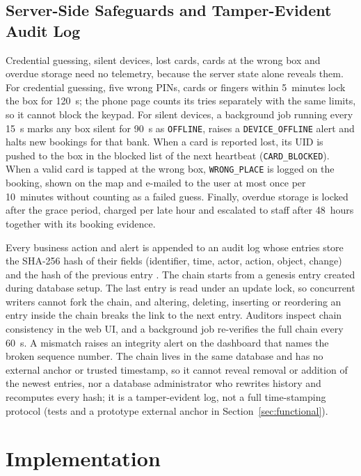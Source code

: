 \documentclass[journal,onecolumn]{IEEEtran}
\begin{document}
\subsection{Server-Side Safeguards and Tamper-Evident Audit Log}

Credential guessing, silent devices, lost cards, cards at the wrong box and overdue storage need no telemetry, because
the server state alone reveals them. For credential guessing, five wrong PINs, cards or fingers within 5~minutes lock
the box for 120~s; the phone page counts its tries separately with the same limits, so it cannot block the keypad. For silent devices, a background job
running every 15~s marks any box silent for 90~s as \texttt{OFFLINE}, raises a \texttt{DEVICE\_OFFLINE} alert and halts
new bookings for that bank. When a card is reported lost, its UID is pushed to the box in the blocked list of the next
heartbeat (\texttt{CARD\_BLOCKED}). When a valid card is tapped at the wrong box, \texttt{WRONG\_PLACE} is logged on the
booking, shown on the map and e-mailed to the user at most once per 10~minutes without counting as a failed guess.
Finally, overdue storage is locked after the grace period, charged per late hour and escalated to staff after 48~hours
together with its booking evidence.

Every business action and alert is appended to an audit log whose entries store the SHA-256 hash of their fields
(identifier, time, actor, action, object, change) and the hash of the previous entry \cite{haber1991timestamp}. The
chain starts from a genesis entry created during database setup. The last entry is read under an update lock, so concurrent writers cannot fork the chain, and
altering, deleting, inserting or reordering an entry inside the chain breaks the link to the next entry. Auditors inspect
chain consistency in the web UI, and a background job re-verifies the full chain every 60~s. A mismatch raises an
integrity alert on the dashboard that names the broken sequence number. The chain lives in the same database and has
no external anchor or trusted timestamp, so it cannot reveal removal or addition of the newest entries, nor a database
administrator who rewrites history and recomputes every hash; it is a tamper-evident log, not a full time-stamping
protocol (tests and a prototype external anchor in Section~\ref{sec:functional}).

\section{Implementation}
\end{document}
